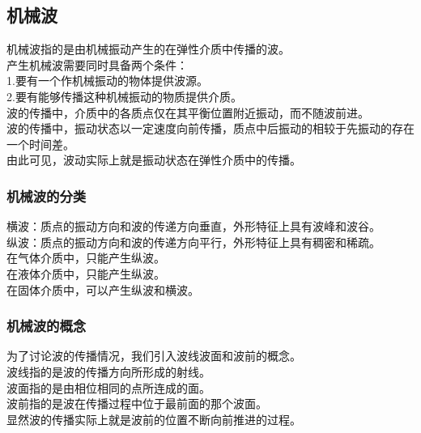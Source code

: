 \documentclass[UTF8]{ctexart}
\begin{document}
\newpage

\subsection{机械波}
    机械波指的是由机械振动产生的在弹性介质中传播的波。\\[3mm]
    产生机械波需要同时具备两个条件：\\[3mm]
    1.要有一个作机械振动的物体提供波源。\\[3mm]
    2.要有能够传播这种机械振动的物质提供介质。\\[5mm]
    波的传播中，介质中的各质点仅在其平衡位置附近振动，而不随波前进。\\[3mm]
    波的传播中，振动状态以一定速度向前传播，质点中后振动的相较于先振动的存在一个时间差。\\[3mm]
    由此可见，波动实际上就是振动状态在弹性介质中的传播。\\

\subsubsection{机械波的分类}
    横波：质点的振动方向和波的传递方向垂直，外形特征上具有波峰和波谷。\\[3mm]
    纵波：质点的振动方向和波的传递方向平行，外形特征上具有稠密和稀疏。\\[3mm]
    在气体介质中，只能产生纵波。\\[3mm]
    在液体介质中，只能产生纵波。\\[3mm]
    在固体介质中，可以产生纵波和横波。\\

\subsubsection{机械波的概念}
    为了讨论波的传播情况，我们引入波线波面和波前的概念。\\[3mm]
    波线指的是波的传播方向所形成的射线。\\[3mm]
    波面指的是由相位相同的点所连成的面。\\[3mm]
    波前指的是波在传播过程中位于最前面的那个波面。\\[3mm]
    显然波的传播实际上就是波前的位置不断向前推进的过程。\\

\newpage
\end{document}
